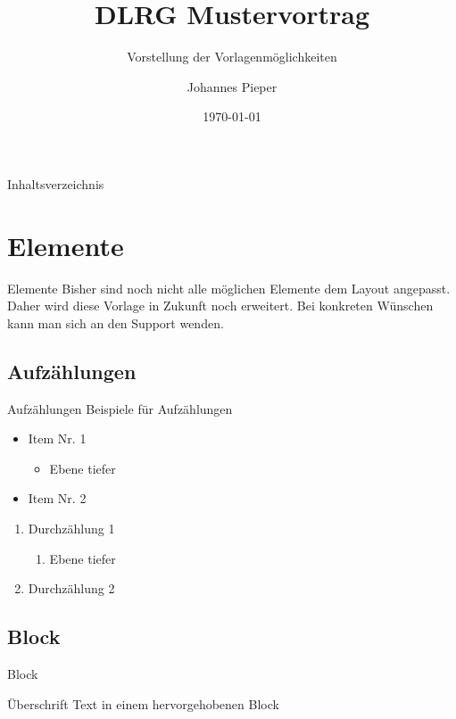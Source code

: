 \documentclass[]{beamer}
\title{DLRG Mustervortrag}
\subtitle{Vorstellung der Vorlagenmöglichkeiten}
\author{Johannes Pieper}
\institute{\LaTeX\ in der DLRG}
\date{\today}
\begin{document}
\begin{frame}
    \titlepage
\end{frame}

\begin{frame}{Inhaltsverzeichnis}
    \tableofcontents
\end{frame}

\section{Elemente}
\begin{frame}{Elemente}
    Bisher sind noch nicht alle möglichen Elemente dem Layout angepasst. Daher wird diese Vorlage in Zukunft noch erweitert. Bei konkreten Wünschen kann man sich an den Support wenden.
\end{frame}

\subsection{Aufzählungen}
\begin{frame}{Aufzählungen}
    Beispiele für Aufzählungen
    \begin{itemize}
        \item Item Nr. 1
        \begin{itemize}
            \item Ebene tiefer
        \end{itemize}
        \item Item Nr. 2
    \end{itemize}

    \begin{enumerate}
        \item Durchzählung 1
        \begin{enumerate}
            \item Ebene tiefer
        \end{enumerate}
        \item Durchzählung 2
    \end{enumerate}
\end{frame}

\subsection{Block}
\begin{frame}{Block}
    \begin{block}{Überschrift}
        Text in einem hervorgehobenen Block
    \end{block}
\end{frame}
\end{document}
